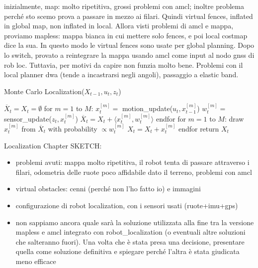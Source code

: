 inizialmente, map: molto ripetitiva, grossi problemi con amcl;  inoltre problema perché sto scemo prova a passare in mezzo ai filari. Quindi virtual fences, inflated in global map, non inflated in local. Allora visti problemi di amcl e mappa, proviamo mapless: mappa bianca in cui mettere solo fences, e poi local costmap dice la sua. In questo modo le virtual fences sono usate per global planning. 
Dopo lo switch, provato a reintegrare la mappa usando amcl come input al nodo gnss di rob loc. Tuttavia, per motivi da capire non funzia molto bene. Problemi con il local planner dwa (tende a incastrarsi negli angoli), passaggio a elastic band.




\begin{algorithm}
\caption{Monte Carlo Localization($X_{t-1},u_t,z_t$)}\label{alg:mcl}
\begin{algorithmic}[1]
\State $\overline{X}_t=X_t=\emptyset$
\State for $m=1$ to $M$: 
\Indent
	\State $x^{[m]}_t=$ motion\_update($u_t,x^{[m]}_{t-1}$)
	\State $w^{[m]}_t=$ sensor\_update($z_t,x^{[m]}_{t}$)
	\State $\overline{X}_t = {X}_t + \big \langle x^{[m]}_t, w^{[m]}_t \big \rangle$
\EndIndent
\State endfor
\State for $m=1$ to $M$: 
\Indent
	\State draw $x^{[m]}_t$ from $\overline{X}_t$ with probability $\propto w^{[m]}_t$
	\State $X_t=X_t+x^{[m]}_t$
\EndIndent
\State endfor
\State return $X_t$
\end{algorithmic}
\end{algorithm}



Localization Chapter SKETCH:
\begin{itemize}
	\item problemi avuti: mappa molto ripetitiva, il robot tenta di passare attraverso i filari, odometria delle ruote poco affidabile dato il terreno, problemi con amcl
	\item virtual obstacles: cenni (perché non l'ho fatto io) e immagini
	\item configurazione di robot localization, con i sensori usati (ruote+imu+gps)
	\item non sappiamo ancora quale sarà la soluzione utilizzata alla fine tra la versione mapless e amcl integrato con robot\_localization (o eventuali altre soluzioni che salteranno fuori). Una volta che è stata presa una decisione, presentare quella come soluzione definitiva e spiegare perché l'altra è stata giudicata meno efficace
\end{itemize}


